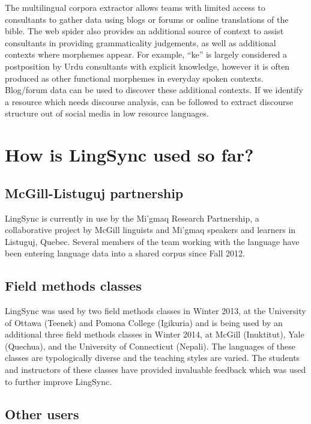 \documentclass[letterpaper, 12pt, dvips]{mitwpl}
\begin{document}
The multilingual corpora extractor allows teams with limited access to consultants to gather data using blogs or forums or online translations of the bible.
The web spider also provides an additional source of context to assist consultants in providing grammaticality judgements,
as well as additional contexts where morphemes appear.
For example,
``ke'' is largely considered a postposition by Urdu consultants with explicit knowledge,
however it is often produced as other functional morphemes in everyday spoken contexts.
Blog/forum data can be used to discover these additional contexts.
If we identify a resource which needs discourse analysis, \cite{Dubuc:2010} can be followed to extract discourse structure out of social media in low resource languages.

\section{How is LingSync used so far?} 

\subsection{McGill-Listuguj partnership}

LingSync is currently in use by the Mi'gmaq Research Partnership,
a collaborative project by McGill linguists and Mi'gmaq speakers and learners in Listuguj,
Quebec.
Several members of the team working with the language have been entering language data into a shared corpus since Fall 2012.

\subsection{Field methods classes} 

LingSync was used by two field methods classes in Winter 2013,
at the University of Ottawa (Teenek) and Pomona College  (Igikuria) and is being used by an additional three field methods classes in Winter 2014,
at McGill (Inuktitut),
Yale (Quechua),
and the University of Connecticut (Nepali).
The languages of these classes are typologically diverse and the teaching styles are varied.
The students and instructors of these classes have provided invaluable feedback which was used to further improve LingSync.


\subsection{Other users} 
\end{document}
